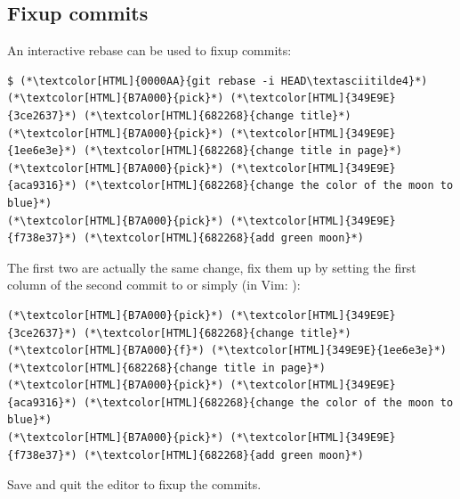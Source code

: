 \subsection{Fixup commits}
\begin{frame}[fragile]
  \subslidetitle
  An interactive rebase can be used to fixup commits:

  \begin{lstlisting}
$ (*\textcolor[HTML]{0000AA}{git rebase -i HEAD\textasciitilde4}*)
(*\textcolor[HTML]{B7A000}{pick}*) (*\textcolor[HTML]{349E9E}{3ce2637}*) (*\textcolor[HTML]{682268}{change title}*)
(*\textcolor[HTML]{B7A000}{pick}*) (*\textcolor[HTML]{349E9E}{1ee6e3e}*) (*\textcolor[HTML]{682268}{change title in page}*)
(*\textcolor[HTML]{B7A000}{pick}*) (*\textcolor[HTML]{349E9E}{aca9316}*) (*\textcolor[HTML]{682268}{change the color of the moon to blue}*)
(*\textcolor[HTML]{B7A000}{pick}*) (*\textcolor[HTML]{349E9E}{f738e37}*) (*\textcolor[HTML]{682268}{add green moon}*)
\end{lstlisting}

  The first two are actually the same change, fix them up by setting the first
  column of the second commit to  or simply  (in Vim: ):

  \begin{lstlisting}
(*\textcolor[HTML]{B7A000}{pick}*) (*\textcolor[HTML]{349E9E}{3ce2637}*) (*\textcolor[HTML]{682268}{change title}*)
(*\textcolor[HTML]{B7A000}{f}*) (*\textcolor[HTML]{349E9E}{1ee6e3e}*) (*\textcolor[HTML]{682268}{change title in page}*)
(*\textcolor[HTML]{B7A000}{pick}*) (*\textcolor[HTML]{349E9E}{aca9316}*) (*\textcolor[HTML]{682268}{change the color of the moon to blue}*)
(*\textcolor[HTML]{B7A000}{pick}*) (*\textcolor[HTML]{349E9E}{f738e37}*) (*\textcolor[HTML]{682268}{add green moon}*)
\end{lstlisting}

  Save and quit the editor to fixup the commits.
\end{frame}

